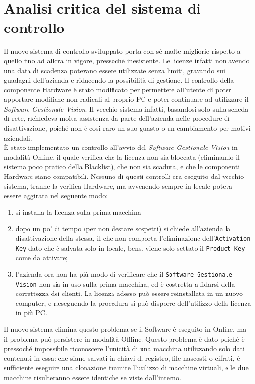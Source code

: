 \section{Analisi critica del sistema di controllo}

Il nuovo sistema di controllo sviluppato porta con sé molte migliorie rispetto a quello fino ad allora in vigore, pressoché inesistente. Le licenze infatti non avendo una data di scadenza potevano essere utilizzate senza limiti, gravando sui guadagni dell'azienda e riducendo la possibilità di gestione. Il controllo della componente Hardware è stato modificato per permettere all'utente di poter apportare modifiche non radicali al proprio PC e poter continuare ad utilizzare il \textit{Software Gestionale Vision}. Il vecchio sistema infatti, basandosi solo sulla scheda di rete, richiedeva molta assistenza da parte dell'azienda nelle procedure di disattivazione, poiché non è cosi raro un suo guasto o un cambiamento per motivi aziendali.
\\È stato implementato un controllo all'avvio del \textit{Software Gestionale Vision} in modalità Online, il quale verifica che la licenza non sia bloccata (eliminando il sistema poco pratico della Blacklist), che non sia scaduta, e che le componenti Hardware siano compatibili. Nessuno di questi controlli era eseguito dal vecchio sistema, tranne la verifica Hardware, ma avvenendo sempre in locale poteva essere aggirata nel seguente modo:
\begin{enumerate}
\item si installa la licenza sulla prima macchina;
\item dopo un po' di tempo (per non destare sospetti) si chiede all'azienda la disattivazione della stessa, il che non comporta l'eliminazione dell'\texttt{Activation Key} dato che è salvata solo in locale, bensì viene solo settato il \texttt{Product Key} come da attivare;
\item l'azienda ora non ha più modo di verificare che il \texttt{Software Gestionale Vision} non sia in uso sulla prima macchina, ed è costretta a fidarsi della correttezza dei clienti. La licenza adesso può essere reinstallata in un nuovo computer, e rieseguendo la procedura si può disporre dell'utilizzo della licenza in più PC.
\end{enumerate}
Il nuovo sistema elimina questo problema se il Software è eseguito in Online, ma il problema può persistere in modalità Offline. Questo problema è dato poiché è pressoché impossibile riconoscere l'unicità di una macchina utilizzando solo dati contenuti in essa: che siano salvati in chiavi di registro, file nascosti o cifrati, è sufficiente eseguire una clonazione tramite l'utilizzo di macchine virtuali, e le due macchine risulteranno essere identiche se viste dall'interno.
